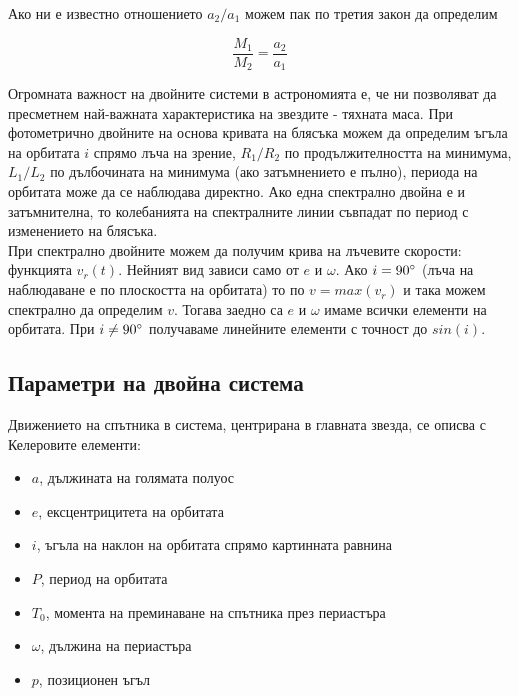 \documentclass[a4paper,12pt]{article}
\begin{document}
Ако ни е известно отношението $a_2/a_1$ можем пак по третия закон да определим

\begin{equation}
    \frac{M_1}{M_2} = \frac{a_2}{a_1}
\end{equation}

Огромната важност на двойните системи в астрономията е, че ни позволяват да пресметнем най-важната характеристика на звездите - тяхната маса. При фотометрично двойните на основа кривата на блясъка можем да определим ъгъла на орбитата $i$ спрямо лъча на зрение, $R_1/R_2$ по продължителността на минимума, $L_1/L_2$ по дълбочината на минимума (ако затъмнението е пълно),  периода на орбитата може да се наблюдава директно. Ако една спектрално двойна е и затъмнителна, то колебанията на спектралните линии съвпадат по период с изменението на блясъка.\\

При спектрално двойните можем да получим крива на лъчевите скорости: функцията $v_r(t)$. Нейният вид зависи само от $e$ и $\omega$. Ако $i=90\degree$ (лъча на наблюдаване е по плоскостта на орбитата) то по $v = max(v_r)$ и така можем спектрално да определим $v$. Тогава заедно са $e$ и $\omega$ имаме всички елементи на орбитата. При $i \neq 90\degree$ получаваме линейните елементи с точност до $sin(i)$.

\subsection{Параметри на двойна система}

Движението на спътника в система, центрирана в главната звезда, се описва с Келеровите елементи:
 
\begin{itemize}
\item $a$, дължината на голямата полуос
\item $e$, ексцентрицитета на орбитата
\item $i$, ъгъла на наклон на орбитата спрямо картинната равнина
\item $P$, период на орбитата
\item $T_0$, момента на преминаване на спътника през периастъра
\item $\omega$, дължина на периастъра
\item $p$, позиционен ъгъл
\end{itemize}
\end{document}
